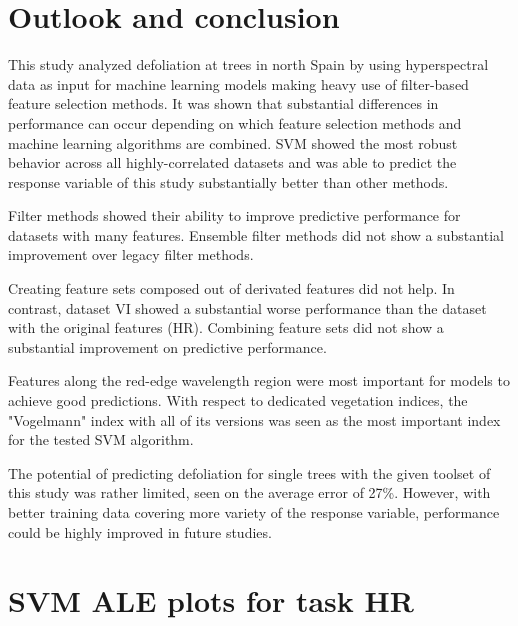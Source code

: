 \documentclass[letterpaper, peerreview]{IEEEtran}
\begin{document}
\section{Outlook and conclusion}
This study analyzed defoliation at trees in north Spain by using hyperspectral data as input for machine learning models making heavy use of filter-based feature selection methods.
It was shown that substantial differences in performance can occur depending on which feature selection methods and machine learning algorithms are combined.
SVM showed the most robust behavior across all highly-correlated datasets and was able to predict the response variable of this study substantially better than other methods.

Filter methods showed their ability to improve predictive performance for datasets with many features.
Ensemble filter methods did not show a substantial improvement over legacy filter methods.

Creating feature sets composed out of derivated features did not help.
In contrast, dataset VI showed a substantial worse performance than the dataset with the original features (HR).
Combining feature sets did not show a substantial improvement on predictive performance.

Features along the red-edge wavelength region were most important for models to achieve good predictions.
With respect to dedicated vegetation indices, the "Vogelmann" index with all of its versions was seen as the most important index for the tested SVM algorithm.

The potential of predicting defoliation for single trees with the given toolset of this study was rather limited, seen on the average error of 27\%. 
However, with better training data covering more variety of the response variable, performance could be highly improved in future studies.

\appendices{}

\section{SVM ALE plots for task HR}
\end{document}
